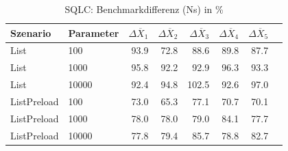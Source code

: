 
\begin{table}[ht]
\setlength{\extrarowheight}{-1pt}
\centering
\caption{SQLC: Benchmarkdifferenz (Ns) in \%}
\begin{tabular}{llrrrrrr}
\toprule
Szenario & Parameter & ${\Delta \overline{X}_1}$ & ${\Delta \overline{X}_2}$ & ${\Delta \overline{X}_3}$ & ${\Delta \overline{X}_4}$ & ${\Delta \overline{X}_5}$ \\
\midrule
	List & 100 & \cellcolor{green!12}  93.9 & \cellcolor{green!21}  72.8 & \cellcolor{green!15}  88.6 & \cellcolor{green!14}  89.8 & \cellcolor{green!15}  87.7 \\
	List & 1000 & \cellcolor{green!12}  95.8 & \cellcolor{green!13}  92.2 & \cellcolor{green!13}  92.9 & \cellcolor{green!11}  96.3 & \cellcolor{green!13}  93.3 \\
	List & 10000 & \cellcolor{green!13}  92.4 & \cellcolor{green!12}  94.8 & \cellcolor{red!11}  102.5 & \cellcolor{green!13}  92.6 & \cellcolor{green!11}  97.0 \\
	ListPreload & 100 & \cellcolor{green!21}  73.0 & \cellcolor{green!24}  65.3 & \cellcolor{green!19}  77.1 & \cellcolor{green!22}  70.7 & \cellcolor{green!22}  70.1 \\
	ListPreload & 1000 & \cellcolor{green!19}  78.0 & \cellcolor{green!19}  78.0 & \cellcolor{green!18}  79.0 & \cellcolor{green!16}  84.1 & \cellcolor{green!19}  77.7 \\
	ListPreload & 10000 & \cellcolor{green!19}  77.8 & \cellcolor{green!18}  79.4 & \cellcolor{green!16}  85.7 & \cellcolor{green!18}  78.8 & \cellcolor{green!17}  82.7 \\
\bottomrule
\end{tabular}
\label{tab:benchmarkdifferenz_sqlc_ns}
\end{table}
	